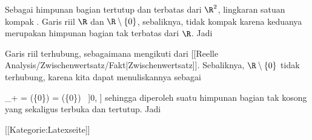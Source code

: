 Sebagai himpunan bagian tertutup dan terbatas dari $\R^2$, lingkaran satuan kompak
 {} {.} Garis riil $\R$ dan $\R \setminus \{0\}$, sebaliknya, tidak kompak karena keduanya merupakan himpunan bagian tak terbatas dari $\R$. Jadi

Garis riil terhubung, sebagaimana mengikuti dari
[[Reelle Analysis/Zwischenwertsatz/Fakt|Zwischenwertsatz]].
Sebaliknya, $\R \setminus \{0\}$ tidak terhubung, karena kita dapat menuliskannya sebagai

\mavergleichskettedisp
{\vergleichskette
{\R_+
}
{ =} { (\R \setminus \{0\}) \cap [0, \infty]
}
{ =} { (\R \setminus \{0\}) \cap \, ]0, \infty]
}
{ } {
}
{ } {
}
}
{}{}{}
sehingga diperoleh suatu himpunan bagian tak kosong yang sekaligus terbuka dan tertutup. Jadi

 [[Kategorie:Latexseite]]
